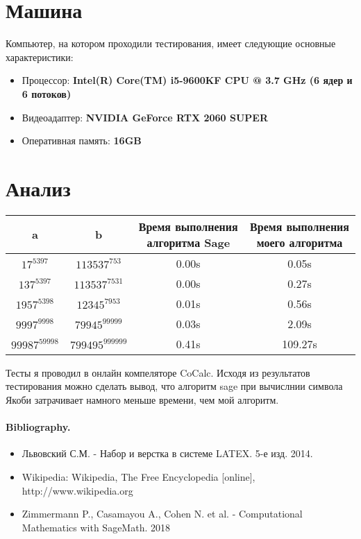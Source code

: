 \documentclass[11pt]{article}
\begin{document}
\section{Машина}
Компьютер, на котором проходили тестирования, имеет следующие основные характеристики:
\begin{itemize}
\item Процессор: \textbf{Intel(R) Core(TM) i5-9600KF CPU @ 3.7 GHz (6 ядер и 6 потоков)}
\item Видеоадаптер: \textbf{NVIDIA GeForce RTX 2060 SUPER}
\item Оперативная память: \textbf{16GB}
\end{itemize}
\section{Анализ}

\begin{tabular}{|c|c|c|c|}
\hline
a & b & Время выполнения алгоритма Sage & Время выполнения моего алгоритма\\
\hline
$17^{5397}$ & $113537^{753}$ & 0.00s & 0.05s\\
$137^{5397}$ & $113537^{7531}$ & 0.00s & 0.27s\\
$1957^{5398}$ & $12345^{7953}$ & 0.01s & 0.56s\\
$9997^{9998}$ & $79945^{99999}$ & 0.03s & 2.09s\\
$99987^{59998}$ & $799495^{999999}$ & 0.41s & 109.27s\\
\hline
\end{tabular}

Тесты я проводил в онлайн компеляторе CoCalc. Исходя из результатов тестирования можно сделать вывод, что алгоритм sage при вычислнии символа Якоби затрачивает намного меньше времени, чем мой алгоритм.

\paragraph{Bibliography.}
\begin{itemize}
\item Львовский С.М. - Набор и верстка в системе LATEX. 5-е изд. 2014.
\item Wikipedia: Wikipedia, The Free Encyclopedia [online], http://www.wikipedia.org
\item Zimmermann P., Casamayou A., Cohen N. et al. - Computational Mathematics with SageMath. 2018
\end{itemize}
\end{document}
